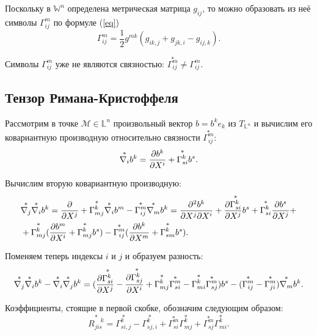 \documentclass[14pt,a4paper]{extarticle}
\begin{document}
Поскольку в $\mathbb{W}^n$ определена метрическая матрица $g_{ij}$, то можно образовать из неё символы $\Gamma_{ij}^m$ по формуле (\ref{eq})
\begin{equation}\label{eq25}
 \Gamma_{ij}^m = \frac{1}{2}g^{mk}(g_{ik,j} + g_{jk,i} - g_{ij,k}).
\end{equation}

Символы $\Gamma_{ij}^m$ уже не являются связностью: $\overset{*}{\Gamma_{ij}^m} \neq  \Gamma_{ij}^m$.


\subsection{Тензор Римана-Кристоффеля}
Рассмотрим в точке $\mathcal{M} \in \mathbb{L}^n$ произвольный вектор $b = b^ke_k$ из $T_{\mathbb{L}^n}$ и вычислим его ковариантную производную относительно связности $\overset{*}{\Gamma_{ij}^m}$:
\begin{equation} \label{eq 28}
	\overset{*}{\nabla_i}b^k = \pdv{b^k}{X^i} + \overset{*}{\Gamma_{si}^k}b^s.
\end{equation}

Вычислим вторую ковариантную производную:
\begin{align}\label{eq29}
\begin{split}
	&\overset{*}{\nabla_j} \overset{*}{\nabla_i} b^k = \pdv{}{X^j} (\overset{*}{\nabla_i}b^k) + \overset{*}{\Gamma_{mj}^k} \overset{*}{\nabla_i} b^m - \overset{*}{\Gamma_{ij}^m} \overset{*}{\nabla_m} b^k = \pdv{b^k}{X^j}{X^i} + \pdv{\overset{*}{\Gamma_{si}^k}}{X^j}b^s + \overset{*}{\Gamma_{si}^k} \pdv{b^s}{X^j} +\\ &+\overset{*}{\Gamma_{mj}^k} (\pdv{b^m}{X^i} + \overset{*}{\Gamma_{mj}^k} b^s) - \overset{*}{\Gamma_{ij}^m}(\pdv{b^k}{X^m} + \overset{*}{\Gamma_{sm}^k}b^s).
\end{split}	
\end{align}

Поменяем теперь индексы $i$ и $j$ и образуем разность:
\begin{equation}\label{eq30}
	\overset{*}{\nabla_j} \overset{*}{\nabla_i} b^k - \overset{*}{\nabla_i} \overset{*}{\nabla_j} b^k = (\pdv{\overset{*}{\Gamma_{si}^k}}{X^j} - \pdv{\overset{*}{\Gamma_{sj}^k}}{X^i} + \overset{*}{\Gamma_{mj}^k} \overset{*}{\Gamma_{si}^m} - \overset{*}{\Gamma_{mi}^k} \overset{*}{\Gamma_{sj}^m})b^s - (\overset{*}{\Gamma_{ij}^m} - \overset{*}{\Gamma_{ji}^m}) \overset{*}{\nabla_m}b^k.
\end{equation}


Коэффициенты, стоящие в первой скобке, обозначим следующим образом:
\begin{equation}\label{eq31}
	\overset{*}{R_{jis}^{\quad k}} = \overset{*}{\Gamma_{si,j}^k} - \overset{*}{\Gamma_{sj,i}^k} + \overset{*}{\Gamma_{si}^m} \overset{*}{\Gamma_{mj}^k} + \overset{*}{\Gamma_{sj}^m} \overset{*}{\Gamma_{mi}^k}.
\end{equation}
\end{document}
